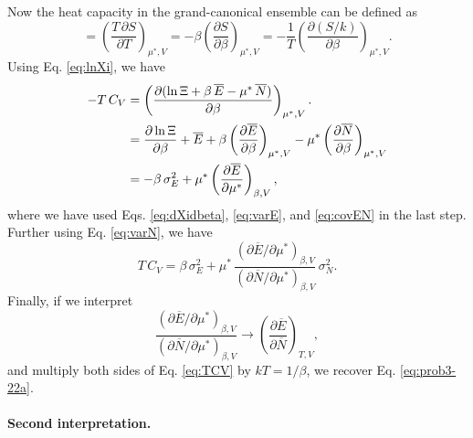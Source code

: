 \documentclass{article}
\begin{document}
Now the heat capacity in the grand-canonical ensemble can be defined as
%
\begin{equation}
= \left( \frac{ T \, \partial S } { \partial T } \right)_{\mu^*, V}
= -\beta \left( \frac{ \partial S } { \partial \beta } \right)_{\mu^*, V}
= -\frac{1}{T} \left( \frac{ \partial (S/k) } { \partial \beta } \right)_{\mu^*, V}.
\label{eq:CV_def}
\end{equation}
%
Using Eq. \eqref{eq:lnXi}, we have
\begin{align}
-T \, C_V
  &= \left( \frac{ \partial (\ln \Xi + \beta \, \overline E - \mu^* \, \overline N) }
  { \partial \beta } \right)_{\mu^*, V}.
  \notag
  \\
  &= \frac{ \partial \ln \Xi } { \partial \beta }
  + \overline E
  + \beta \left( \frac{ \partial \overline E } { \partial \beta } \right)_{\mu^*, V}
  - \mu^* \left( \frac{ \partial \overline N } { \partial \beta } \right)_{\mu^*, V}
  \notag
  \\
  &=
  - \beta \, \sigma_E^2
  + \mu^* \left( \frac{ \partial \overline E } { \partial \mu^* } \right)_{\beta, V}
  ,
  \notag
\end{align}
%
where we have used Eqs. \eqref{eq:dXidbeta}, \eqref{eq:varE}, and \eqref{eq:covEN}
in the last step.
%
Further using Eq. \eqref{eq:varN}, we have
\begin{equation}
T \, C_V
=
\beta \, \sigma_E^2
+
\mu^* \,
\frac{ \left( \partial \overline E / \partial \mu^* \right)_{\beta, V} }
     { \left( \partial \overline N / \partial \mu^* \right)_{\beta, V} }
\, \sigma_N^2
.
\label{eq:TCV}
\end{equation}
Finally, if we interpret
$$
\frac{ \left( \partial \overline E / \partial \mu^* \right)_{\beta, V} }
     { \left( \partial \overline N / \partial \mu^* \right)_{\beta, V} }
\to
\left(
  \frac{ \partial \overline E }
       { \partial \overline N }
\right)_{T, V}
,
$$
and multiply both sides of Eq. \eqref{eq:TCV} by $k T = 1/\beta$,
we recover Eq. \eqref{eq:prob3-22a}.

\paragraph{Second interpretation.}
\end{document}
